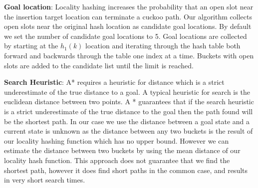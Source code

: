 \textbf{Goal location}: Locality hashing increases the
probability that an open slot near the insertion target
location can terminate a cuckoo path. Our algorithm collects
open slots near the original hash location as candidate goal
locations. By default we set the number of candidate goal
locations to 5. Goal locations are collected by starting at
the $h_1(k)$ location and iterating through the hash
table both forward and backwards through the table one index
at a time. Buckets with open slots are added to the
candidate list until the limit is reached. 


\textbf{Search Heuristic}: A* requires a heuristic for
distance which is a strict underestimate of the true
distance to a goal. A typical heuristic for search is the
euclidean distance between two points. A * guarantees that
if the search heuristic is a strict underestimate of the
true distance to the goal then the path found will be the
shortest path. In our case we use the distance between a
goal state and a current state is unknown as the distance
between any two buckets is the result of our locality
hashing function which has no upper bound. However we can
estimate the distance between two buckets by using the mean
distance of our locality hash function. This approach does
not guarantee that we find the shortest path, however it
does find short paths in the common case, and results in
very short search times.